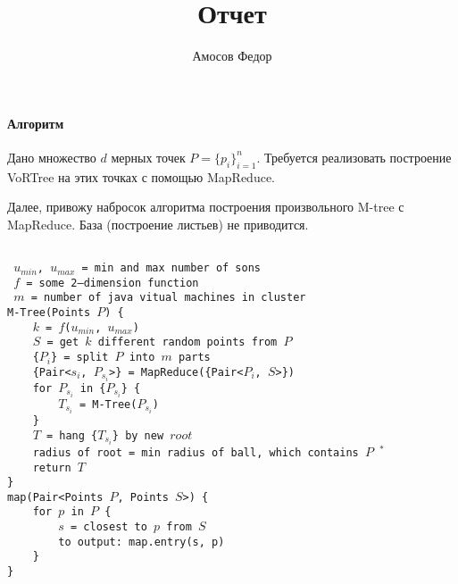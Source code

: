 \documentclass{article}
\title{\bf Отчет \No 2}
\author{Амосов Федор}
\begin{document}
	\maketitle
	
	\paragraph{Алгоритм \\}
	    Дано множество $d$ мерных точек $P = \{p_i\}_{i = 1}^n$. Требуется реализовать построение VoRTree на этих точках с помощью MapReduce.
	    
	    Далее, привожу набросок алгоритма построения произвольного M-tree с MapReduce. База (построение листьев) не приводится.

        {\tt
            \phantom ~~ \\
            \phantom ~$u_{min}$, $u_{max}$ = min and max number of sons    \\
            \phantom ~$f$ = some 2--dimension function    \\
            \phantom ~$m$ = number of java vitual machines in cluster    \\
            
            \noindent M-Tree(Points $P$) \{ \\
            \phantom ~~~~$k$ = $f$($u_{min}$, $u_{max}$)    \\
            \phantom ~~~~$S$ = get $k$ different random points from $P$      \\
            \phantom ~~~~\{$P_i$\} = split $P$ into $m$ parts    \\
            \phantom ~~~~\{Pair<$s_i$, $P_{s_i}$>\} = MapReduce(\{Pair<$P_i$, $S$>\})    \\  
            \phantom ~~~~for $P_{s_i}$ in \{$P_{s_i}$\} \{   \\ 
            \phantom ~~~~~~~~$T_{s_i}$ = M-Tree($P_{s_i}$)    \\
            \phantom ~~~~\}    \\
            \phantom ~~~~$T$ = hang \{$T_{s_i}$\} by new $root$    \\
            \phantom ~~~~radius of root = min radius of ball, which contains $P$  $^*$\\
            \phantom ~~~~return $T$    \\ 
                     \}    \\
            
            \noindent map(Pair<Points $P$, Points $S$>) \{    \\
            \phantom ~~~~for $p$ in $P$ \{    \\
            \phantom ~~~~~~~~$s$ = closest to $p$ from $S$    \\
            \phantom ~~~~~~~~to output: map.entry(s, p)    \\  
            \phantom ~~~~\}    \\   
                     \}    \\
                     
}
\end{document}
